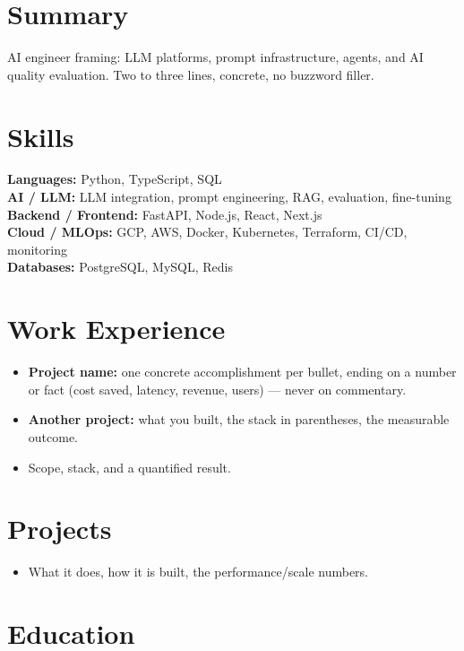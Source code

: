 \documentclass[10pt]{article}
\begin{document}

\section{Summary}
AI engineer framing: LLM platforms, prompt infrastructure, agents, and AI quality evaluation. Two to three lines, concrete, no buzzword filler.

\section{Skills}
\textbf{Languages:} Python, TypeScript, SQL \\
\textbf{AI / LLM:} LLM integration, prompt engineering, RAG, evaluation, fine-tuning \\
\textbf{Backend / Frontend:} FastAPI, Node.js, React, Next.js \\
\textbf{Cloud / MLOps:} GCP, AWS, Docker, Kubernetes, Terraform, CI/CD, monitoring \\
\textbf{Databases:} PostgreSQL, MySQL, Redis

\section{Work Experience}
\begin{itemize}
  \item \textbf{Project name:} one concrete accomplishment per bullet, ending on a number or fact (cost saved, latency, revenue, users) --- never on commentary.
  \item \textbf{Another project:} what you built, the stack in parentheses, the measurable outcome.
\end{itemize}
\begin{itemize}
  \item Scope, stack, and a quantified result.
\end{itemize}

\section{Projects}
\begin{itemize}
  \item What it does, how it is built, the performance/scale numbers.
\end{itemize}

\section{Education}
\end{document}
